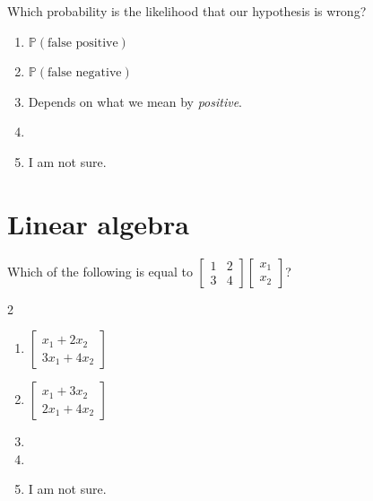 \documentclass[aspectratio=169, t, 14pt]{beamer}
\begin{document}
\begin{frame}
  Which probability is the likelihood that our hypothesis  is wrong?

  \begin{enumerate}
    \item \(\mathbb{P}(\text{false positive})\)
    \item \(\mathbb{P}(\text{false negative})\)
    \item Depends on what we mean by \emph{positive}.
    \item 
    \item I am not sure.
  \end{enumerate}
\end{frame}

\section{Linear algebra}

\begin{frame}
  Which of the following is equal to \(\begin{bmatrix} 1 & 2 \\ 3 & 4 \end{bmatrix} \begin{bmatrix}x_{1} \\ x_{2}\end{bmatrix}\)?
  \begin{multicols}{2}
    \begin{enumerate}
      \item \(\begin{bmatrix} x_{1} + 2 x_{2} \\ 3x_{1} + 4x_{2} \end{bmatrix}\)
      \item \(\begin{bmatrix} x_{1} + 3 x_{2} \\ 2x_{1} + 4x_{2} \end{bmatrix}\)
      \item 
      \item 
      \item I am not sure.
    \end{enumerate}
  \end{multicols}
\end{frame}
\end{document}
